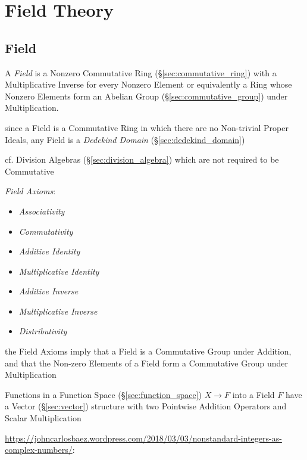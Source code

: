 \section{Field Theory}\label{sec:field_theory}

\subsection{Field}\label{sec:field}

A \emph{Field} is a Nonzero Commutative Ring (\S\ref{sec:commutative_ring}) with
a Multiplicative Inverse for every Nonzero Element or equivalently a Ring whose
Nonzero Elements form an Abelian Group (\S\ref{sec:commutative_group}) under
Multiplication.

since a Field is a Commutative Ring in which there are no Non-trivial Proper
Ideals, any Field is a \emph{Dedekind Domain} (\S\ref{sec:dedekind_domain})

cf. Division Algebras (\S\ref{sec:division_algebra}) which are not required to
be Commutative

\emph{Field Axioms}:
\begin{itemize}
  \item \emph{Associativity}
  \item \emph{Commutativity}
  \item \emph{Additive Identity}
  \item \emph{Multiplicative Identity}
  \item \emph{Additive Inverse}
  \item \emph{Multiplicative Inverse}
  \item \emph{Distributivity}
\end{itemize}

the Field Axioms imply that a Field is a Commutative Group under Addition, and
that the Non-zero Elements of a Field form a Commutative Group under
Multiplication

Functions in a Function Space (\S\ref{sec:function_space}) $X
\rightarrow F$ into a Field $F$ have a Vector (\S\ref{sec:vector})
structure with two Pointwise Addition Operators and Scalar
Multiplication

\url{https://johncarlosbaez.wordpress.com/2018/03/03/nonstandard-integers-as-complex-numbers/}:

